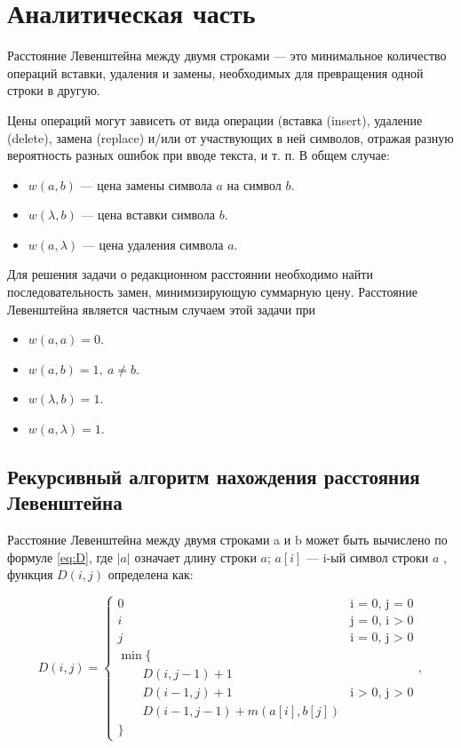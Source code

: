 \chapter{Аналитическая часть}
Расстояние Левенштейна \cite{Lev} между двумя строками — это минимальное количество операций вставки,
удаления и замены, необходимых для превращения одной строки в другую.

Цены операций могут зависеть от вида операции (вставка (insert), удаление (delete), замена (replace)
и/или от участвующих в ней символов, отражая разную вероятность разных ошибок при вводе текста, и т. п. В общем случае:

\begin{itemize}
    \item $w(a,b)$ — цена замены символа $a$ на символ $b$.
    \item $w(\lambda,b)$ — цена вставки символа $b$.
    \item $w(a,\lambda)$ — цена удаления символа $a$.
\end{itemize}

Для решения задачи о редакционном расстоянии необходимо найти последовательность замен, минимизирующую суммарную цену.
Расстояние Левенштейна является частным случаем этой задачи при

\begin{itemize}
    \item $w(a,a)=0$.
    \item $w(a,b)=1, \medspace a \neq b$.
    \item $w(\lambda,b)=1$.
    \item $w(a,\lambda)=1$.
\end{itemize}

\section{Рекурсивный алгоритм нахождения расстояния Левенштейна}

Расстояние Левенштейна между двумя строками a и b может быть вычислено по формуле \eqref{eq:D},
где $|a|$ означает длину строки $a$; $a[i]$ — i-ый символ строки $a$ , функция $D(i, j)$ определена как:

\begin{equation}
    \label{eq:D}
    D(i, j) = \begin{cases}
                  0 &\text{i = 0, j = 0}\\
                  i &\text{j = 0, i > 0}\\
                  j &\text{i = 0, j > 0}\\
                  \min \lbrace \\
                  \qquad D(i, j-1) + 1\\
                  \qquad D(i-1, j) + 1 &\text{i > 0, j > 0}\\
                  \qquad D(i-1, j-1) + m(a[i], b[j])\\
                  \rbrace
    \end{cases},
\end{equation}

